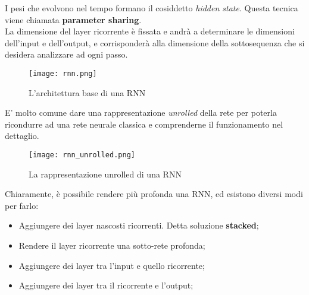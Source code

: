 I pesi che evolvono nel tempo formano il cosiddetto \textit{hidden state}. Questa tecnica viene chiamata \textbf{parameter sharing}.\\
La dimensione del layer ricorrente è fissata e andrà a determinare le dimensioni dell'input e dell'output, e corrisponderà alla dimensione della sottosequenza che si desidera analizzare ad ogni passo.
\begin{figure}[H]
	\centering
	\texttt{[image: rnn.png]}
	\caption{L'architettura base di una RNN}
	\label{fig:rnn}
\end{figure}
E' molto comune dare una rappresentazione \textit{unrolled} della rete per poterla ricondurre ad una rete neurale classica e comprenderne il funzionamento nel dettaglio.
\begin{figure}[H]
	\centering
	\texttt{[image: rnn\_unrolled.png]}
	\caption{La rappresentazione unrolled di una RNN}
	\label{fig:rnn_unrolled}
\end{figure}
Chiaramente, è possibile rendere più profonda una RNN, ed esistono diversi modi per farlo:
\begin{itemize}
	\item Aggiungere dei layer nascosti ricorrenti. Detta soluzione \textbf{stacked};
	\item Rendere il layer ricorrente una sotto-rete profonda;
	\item Aggiungere dei layer tra l'input e quello ricorrente;
	\item Aggiungere dei layer tra il ricorrente e l'output;
\end{itemize}

